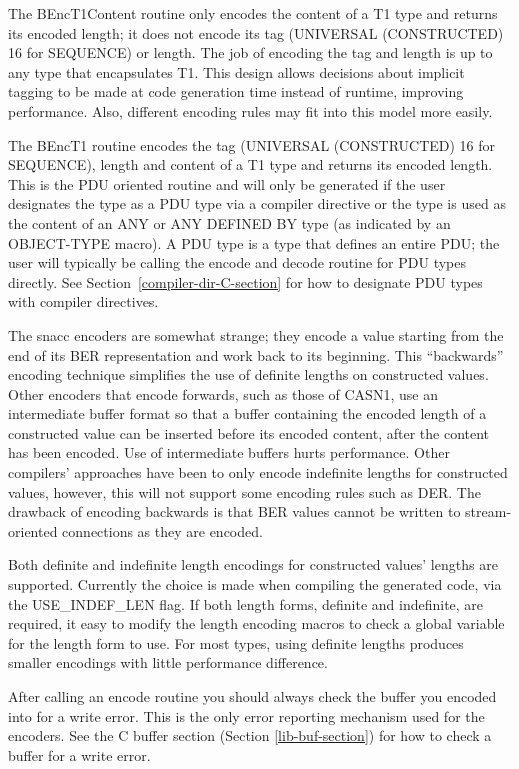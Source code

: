 The {\C BEncT1Content} routine only encodes the content of a {\C T1}
type and returns its encoded length; it does not encode its tag
(UNIVERSAL (CONSTRUCTED) 16 for SEQUENCE) or length.  The job of
encoding the tag and length is up to any type that encapsulates {\C T1}.
This design allows decisions about implicit tagging to be made at code
generation time instead of runtime, improving performance.  Also,
different encoding rules may fit into this model more easily.

The {\C BEncT1} routine encodes the tag (UNIVERSAL (CONSTRUCTED) 16
for SEQUENCE), length and content of a {\C T1} type and returns its encoded
length.  This is the PDU oriented routine and will only be generated
if the user designates the type as a PDU type via a compiler directive
or the type is used as
the content of an ANY or ANY DEFINED BY type (as indicated by an
OBJECT-TYPE macro).  A PDU type is a type that defines an entire PDU;
the user will typically be calling the encode and decode routine for
PDU types directly.  See Section~\ref{compiler-dir-C-section} for how to
designate PDU types with compiler directives.

The snacc encoders are somewhat strange; they encode a value starting
from the end of its BER representation and work back to its beginning.
This ``backwards'' encoding technique simplifies the use of definite
lengths on constructed values.  Other encoders that encode forwards,
such as those of CASN1, use an intermediate buffer format so that a
buffer containing the encoded length of a constructed value can be
inserted before its encoded content, after the content has been
encoded.  Use of intermediate buffers hurts performance.  Other
compilers' approaches have been to only encode indefinite lengths for
constructed values, however, this will not support some encoding rules
such as DER\@.  The drawback of encoding backwards is that BER values
cannot be written to stream-oriented connections as they are encoded.

Both definite and indefinite length encodings for constructed values'
lengths are supported.  Currently the choice is made when compiling
the generated code, via the {\C USE\_INDEF\_LEN} flag.  If both length
forms, definite and indefinite, are required, it easy to modify the
length encoding macros to check a global variable for the length
form to use.  For most types, using definite lengths produces smaller
encodings with little performance difference.

After calling an encode routine you should always check the buffer
you encoded into for a write error.  This is the only error reporting
mechanism used for the encoders.  See the C buffer section (Section
\ref{lib-buf-section}) for how to check a buffer for a write error.


